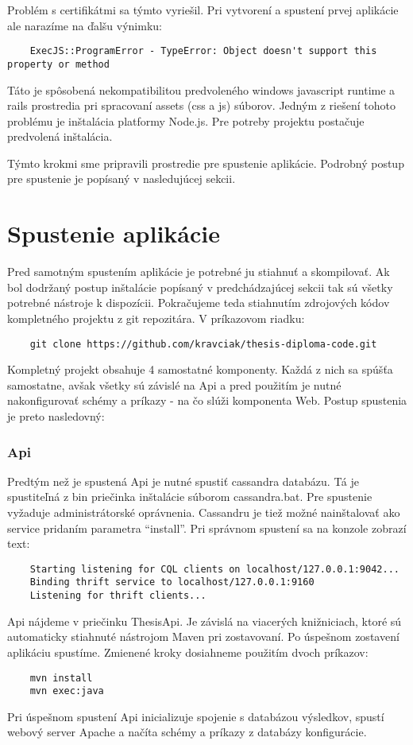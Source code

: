 	Problém s certifikátmi sa týmto vyriešil. Pri vytvorení a spustení prvej aplikácie ale narazíme na ďalšu výnimku:
	\begin{lstlisting}
	ExecJS::ProgramError - TypeError: Object doesn't support this property or method
	\end{lstlisting}
	Táto je spôsobená nekompatibilitou predvoleného windows javascript runtime a rails prostredia pri spracovaní assets (css a js) súborov. Jedným z riešení tohoto problému je inštalácia platformy Node.js. Pre potreby projektu postačuje predvolená inštalácia.
	
	Týmto krokmi sme pripravili prostredie pre spustenie aplikácie. Podrobný postup pre spustenie je popísaný v nasledujúcej sekcii.

\section{Spustenie aplikácie}
	Pred samotným spustením aplikácie je potrebné ju stiahnuť a skompilovať. Ak bol dodržaný postup inštalácie popísaný v predchádzajúcej sekcii tak sú všetky potrebné nástroje k dispozícii. Pokračujeme teda stiahnutím zdrojových kódov kompletného projektu z git repozitára. V príkazovom riadku:
	\begin{lstlisting}
	git clone https://github.com/kravciak/thesis-diploma-code.git
	\end{lstlisting}
	Kompletný projekt obsahuje 4 samostatné komponenty. Každá z nich sa spúšťa samostatne, avšak všetky sú závislé na Api a pred použitím je nutné nakonfigurovať schémy a príkazy - na čo slúži komponenta Web. Postup spustenia je preto nasledovný:
	
\subsubsection{Api}
	Predtým než je spustená Api je nutné spustiť cassandra databázu. Tá je spustiteľná z bin priečinka inštalácie súborom cassandra.bat. Pre spustenie vyžaduje administrátorské oprávnenia. Cassandru je tiež možné nainštalovať ako service pridaním parametra ``install''. Pri správnom spustení sa na konzole zobrazí text:
	\begin{lstlisting}
	Starting listening for CQL clients on localhost/127.0.0.1:9042...
	Binding thrift service to localhost/127.0.0.1:9160
	Listening for thrift clients...
	\end{lstlisting}
	
	Api nájdeme v priečinku ThesisApi. Je závislá na viacerých knižniciach, ktoré sú automaticky stiahnuté nástrojom Maven pri zostavovaní. Po úspešnom zostavení aplikáciu spustíme. Zmienené kroky dosiahneme použitím dvoch príkazov:
	\begin{lstlisting}
	mvn install
	mvn exec:java
	\end{lstlisting}
	Pri úspešnom spustení Api inicializuje spojenie s databázou výsledkov, spustí webový server Apache a načíta schémy a príkazy z databázy konfigurácie.
	
